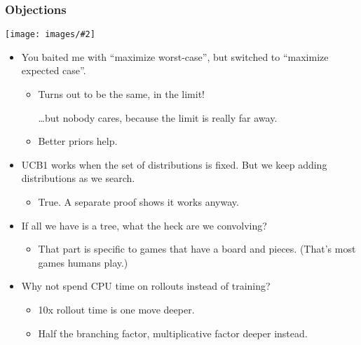 \documentclass[table]{beamer}
\newcommand\img[2]{\texttt{[image: images/\#2]}}
\begin{document}
\begin{frame}
	\frametitle{Objections}
	\begin{center}
		\img{0.25}{trap-card.jpg}
	\end{center}

	\begin{itemize}
		\item You baited me with ``maximize worst-case'', but switched to
			``maximize expected case''.
			\begin{itemize}
				\item Turns out to be the same, in the limit!

					\ldots{}but nobody cares, because the limit is really
					far away.
				\item Better priors help.
			\end{itemize}
		\item UCB1 works when the set of distributions is fixed. But we keep
			adding distributions as we search.
			\begin{itemize}
				\item True. A separate proof shows it works anyway.
			\end{itemize}
		\item If all we have is a tree, what the heck are we convolving?
			\begin{itemize}
				\item That part is specific to games that have a board and
					pieces. (That's most games humans play.)
			\end{itemize}
		\item Why not spend CPU time on rollouts instead of training?
			\begin{itemize}
				\item 10x rollout time is one move deeper.
				\item Half the branching factor, multiplicative factor
					deeper instead.
			\end{itemize}
	\end{itemize}
	\addtocounter{framenumber}{-1}
\end{frame}
\end{document}
